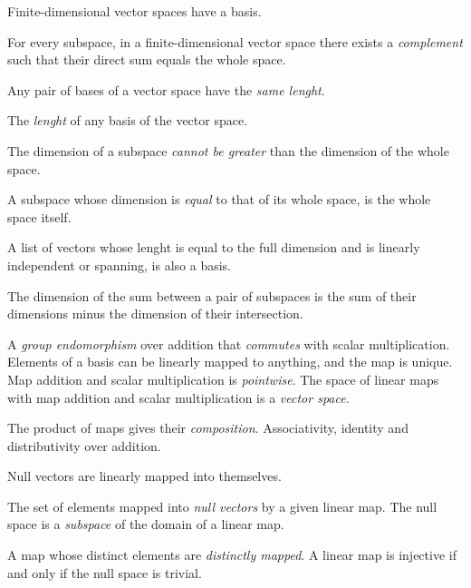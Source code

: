 \begin{multicols}{3}
  Finite-dimensional vector spaces have a basis.
  
  For every subspace, in a finite-dimensional vector space there exists a \textit{complement} such that their direct sum equals the whole space.
  
  Any pair of bases of a vector space have the \textit{same lenght}.
  
  The \textit{lenght} of any basis of the vector space.
  
  The dimension of a subspace \textit{cannot be greater} than the dimension of the whole space.
  
  A subspace whose dimension is \textit{equal} to that of its whole space, is the whole space itself.
  
  A list of vectors whose lenght is equal to the full dimension and is linearly independent or spanning, is also a basis.
  
  The dimension of the sum between a pair of subspaces is the sum of their dimensions minus the dimension of their intersection.

  A \textit{group endomorphism} over addition that \textit{commutes} with scalar multiplication.
  Elements of a basis can be linearly mapped to anything, and the map is unique.
  Map addition and scalar multiplication is \textit{pointwise}.
  The space of linear maps with map addition and scalar multiplication is a \textit{vector space}.

  The product of maps gives their \textit{composition}.
  Associativity, identity and distributivity over addition.

  Null vectors are linearly mapped into themselves.

  The set of elements mapped into \textit{null vectors} by a given linear map.
  The null space is a \textit{subspace} of the domain of a linear map.

  A map whose distinct elements are \textit{distinctly mapped}.
  A linear map is injective if and only if the null space is trivial.


\end{multicols}
